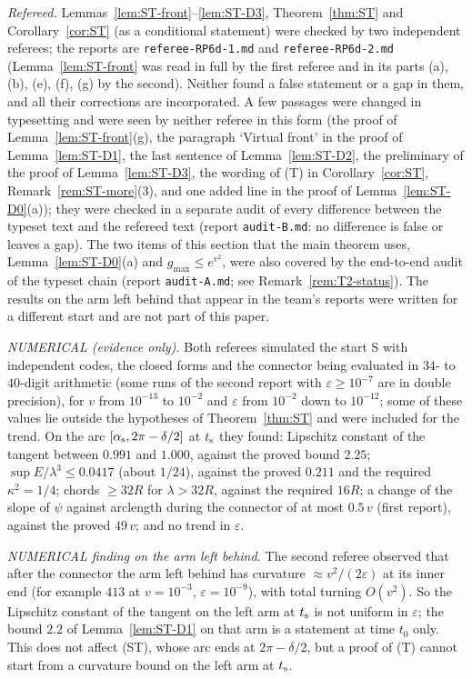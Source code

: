 \begin{remark}[Status]\label{rem:ST-status}
\emph{Refereed.} Lemmas~\ref{lem:ST-front}--\ref{lem:ST-D3}, Theorem~\ref{thm:ST} and Corollary~\ref{cor:ST} (as a conditional
statement) were checked by two independent referees; the reports are \texttt{referee-RP6d-1.md} and
\texttt{referee-RP6d-2.md} (Lemma~\ref{lem:ST-front} was read in full by the first referee and in its parts (a), (b), (e), (f),
(g) by the second). Neither found
a false statement or a gap in them, and all their corrections are incorporated.
A few passages were changed in typesetting and were seen by neither referee
in this form (the proof of Lemma~\ref{lem:ST-front}(g), the paragraph `Virtual front' in the proof of
Lemma~\ref{lem:ST-D1}, the last sentence of Lemma~\ref{lem:ST-D2}, the preliminary of the proof of
Lemma~\ref{lem:ST-D3}, the wording of \textup{(T)} in Corollary~\ref{cor:ST}, Remark~\ref{rem:ST-more}(3), and one added line in
the proof of Lemma~\ref{lem:ST-D0}(a)); they were checked in a
separate audit of every difference between the typeset text and the refereed text (report \texttt{audit-B.md}: no difference is
false or leaves a gap). The two items of this section that the main theorem uses, Lemma~\ref{lem:ST-D0}(a) and
$g_{\max}\le e^{v^2}$, were also covered by the end-to-end audit of the typeset chain (report \texttt{audit-A.md}; see
Remark~\ref{rem:T2-status}). The results on the arm left behind that appear in the
team's reports were written for a different start and are not part of this paper.

\emph{NUMERICAL (evidence only).} Both referees simulated the start S with independent codes, the closed forms and the connector
being evaluated in $34$- to $40$-digit arithmetic (some runs of the second report with $\varepsilon\ge10^{-7}$ are in double precision),
for $v$ from $10^{-13}$ to $10^{-2}$ and $\varepsilon$ from $10^{-2}$ down to $10^{-12}$; some of these values lie outside the
hypotheses of Theorem~\ref{thm:ST} and were included for the trend. On the arc $[\alpha_{\mathrm s},2\pi-\delta/2]$ at $t_{\mathrm s}$ they found: Lipschitz
constant of the tangent between $0.991$ and $1.000$, against the proved bound $2.25$; $\sup E/\lambda^3\le0.0417$ (about $1/24$),
against the proved $0.211$ and the required $\kappa^2=1/4$; chords $\ge32R$ for $\lambda>32R$, against the required $16R$; a change of
the slope of $\psi$ against arclength during the connector of at most $0.5\,v$ (first report), against the proved $49\,v$; and no
trend in $\varepsilon$.

\emph{NUMERICAL finding on the arm left behind.} The second referee observed that after the connector the arm left behind has
curvature $\approx v^2/(2\varepsilon)$ at its inner end (for example $413$ at $v=10^{-3}$, $\varepsilon=10^{-9}$), with total turning
$O(v^2)$. So the Lipschitz constant of the tangent on the left arm at $t_{\mathrm s}$ is not uniform in $\varepsilon$; the bound $2.2$ of
Lemma~\ref{lem:ST-D1} on that arm is a statement at time $t_0$ only. This does not affect \textup{(ST)}, whose arc ends at
$2\pi-\delta/2$, but a proof of \textup{(T)} cannot start from a curvature bound on the left arm at $t_{\mathrm s}$.


\end{remark}
